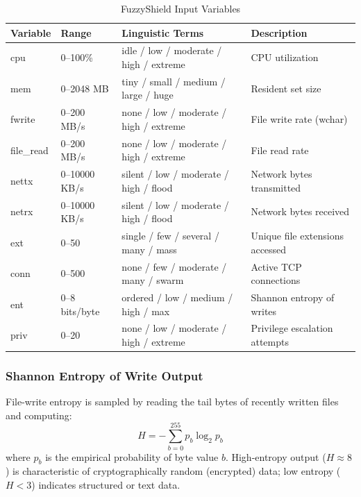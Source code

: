 \documentclass[conference]{IEEEtran}
\begin{document}
\begin{table}[!t]
\centering
\caption{FuzzyShield Input Variables}
\label{tab:inputs}
\renewcommand{\arraystretch}{1.3}
\begin{tabularx}{\textwidth}{
  >{\ttfamily\small}l
  l
  l
  >{\small}X
}
\toprule
\normalfont\textbf{Variable} & \textbf{Range} & \textbf{Linguistic Terms} & \textbf{Description} \\
\midrule
cpu       & 0--100\%         & idle / low / moderate / high / extreme    & CPU utilization \\
mem       & 0--2048 MB       & tiny / small / medium / large / huge      & Resident set size \\
fwrite    & 0--200 MB/s      & none / low / moderate / high / extreme    & File write rate (wchar) \\
file\_read & 0--200 MB/s     & none / low / moderate / high / extreme    & File read rate \\
nettx     & 0--10000 KB/s    & silent / low / moderate / high / flood    & Network bytes transmitted \\
netrx     & 0--10000 KB/s    & silent / low / moderate / high / flood    & Network bytes received \\
ext       & 0--50            & single / few / several / many / mass      & Unique file extensions accessed \\
conn      & 0--500           & none / few / moderate / many / swarm      & Active TCP connections \\
ent       & 0--8 bits/byte   & ordered / low / medium / high / max       & Shannon entropy of writes \\
priv      & 0--20            & none / low / moderate / high / extreme    & Privilege escalation attempts \\
\bottomrule
\end{tabularx}
\end{table}

\subsubsection{Shannon Entropy of Write Output}

File-write entropy is sampled by reading the tail bytes of recently
written files and computing:
\[
  H = -\sum_{b=0}^{255} p_b \log_2 p_b
\]
where $p_b$ is the empirical probability of byte value $b$.
High-entropy output ($H \approx 8$) is characteristic of
cryptographically random (encrypted) data; low entropy ($H < 3$)
indicates structured or text data.
\end{document}
